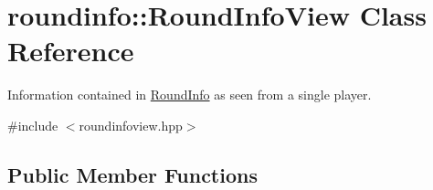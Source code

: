 \hypertarget{classroundinfo_1_1_round_info_view}{}\section{roundinfo\+:\+:Round\+Info\+View Class Reference}
\label{classroundinfo_1_1_round_info_view}


Information contained in {\ttfamily \hyperlink{classroundinfo_1_1_round_info}{Round\+Info}} as seen from a single player.  




{\ttfamily \#include $<$roundinfoview.\+hpp$>$}

\subsection*{Public Member Functions}
